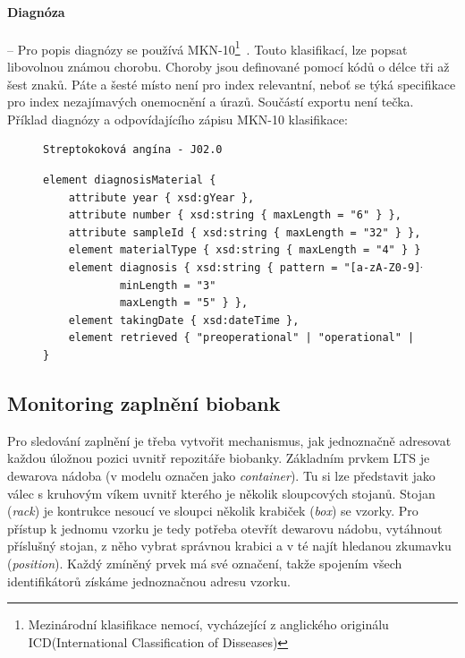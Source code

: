 \paragraph*{Diagnóza} -- Pro popis diagnózy se používá MKN-10\footnote{Mezinárodní klasifikace nemocí, vycházející z anglického originálu ICD(International Classification of Disseases)}~\cite{MKN-10}. Touto klasifikací, lze popsat libovolnou známou chorobu.
Choroby jsou definované pomocí kódů o délce tři až šest znaků. Páte a šesté místo není pro index relevantní, neboť se týká specifikace pro index nezajímavých onemocnění a úrazů. Součástí exportu není tečka. 
Příklad diagnózy a odpovídajícího zápisu MKN-10 klasifikace:

\begin{figure}[h!]
\centering
\begin{BVerbatim}
Streptokoková angína - J02.0
\end{BVerbatim}
\end{figure}

\begin{figure}[h!]
\begin{center}
\begin{lstlisting}[language=XML, caption={Element popisující materiál se stanovenou diagnózou v~exportním schéma.}, label={fig:export:data:diagnosisMaterial}]
element diagnosisMaterial {
	attribute year { xsd:gYear },
	attribute number { xsd:string { maxLength = "6" } },
	attribute sampleId { xsd:string { maxLength = "32" } },
	element materialType { xsd:string { maxLength = "4" } }
	element diagnosis { xsd:string { pattern = "[a-zA-Z0-9]+" 
			minLength = "3" 
			maxLength = "5" } },
	element takingDate { xsd:dateTime },
	element retrieved { "preoperational" | "operational" | "post" | "unknown" }
}
\end{lstlisting}
\end{center}
\end{figure}

\subsection{Monitoring zaplnění biobank}\label{chapter:analysis:subsection:monitoring}
Pro sledování zaplnění je třeba vytvořit mechanismus, jak jednoznačně adresovat každou úložnou pozici uvnitř repozitáře biobanky. 
Základním prvkem LTS je dewarova nádoba (v modelu označen jako \textit{container}). Tu si lze představit jako válec s kruhovým víkem uvnitř kterého je několik sloupcových stojanů. Stojan (\textit{rack}) je kontrukce nesoucí ve sloupci několik krabiček (\textit{box}) se vzorky. Pro přístup k jednomu vzorku je tedy potřeba otevřít dewarovu nádobu, vytáhnout příslušný stojan, z něho vybrat správnou krabici a v té najít hledanou zkumavku (\textit{position}). Každý zmíněný prvek má své označení, takže spojením všech identifikátorů získáme jednoznačnou adresu vzorku.

